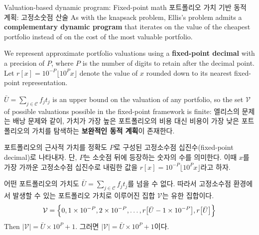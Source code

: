 \documentclass[11pt,mathserif,notheorems]{beamer}
\theoremstyle{definition}
\theoremstyle{definition}
\begin{document}
\begin{frame}{\ifen Valuation-based dynamic program: Fixed-point math \else 포트폴리오 가치 기반 동적 계획: 고정소숫점 산술 \fi}
\ifen 
As with the knapsack problem, Ellis's problem admits a \textbf{complementary dynamic program} that iterates on the value of the cheapest portfolio instead of on the cost of the most valuable portfolio.

We represent approximate portfolio valuations using a \textbf{fixed-point decimal} with a precision of $P$, where $P$ is the number of digits to retain after the decimal point. Let $r[x] =  10^{-P}\lfloor 10^P x \rfloor$ denote the value of $x$ rounded down to its nearest fixed-point representation.

$\bar U = \sum_{j\in \mathcal{C}} f_j t_j$ is an upper bound on the valuation of any portfolio, so the set $\mathcal{V}$ of possible valuations possible in the fixed-point framework is finite:
\else
엘리스의 문제는 배낭 문제와 같이, 가치가 가장 높은 포트폴리오의 비용 대신 비용이 가장 낮은 포트폴리오의 가치를 탐색하는 \textbf{보완적인 동적 계획}이 존재한다. 

포트폴리오의 근사적 가치를 정확도 $P$로 구성된 고정소수점 십진수(fixed-point decimal)로 나타내자. 단, $P$는 소숫점 뒤에 등장하는 숫자의 수를 의미한다. 이때 $x$를 가장 가까운 고정소수점 십진수로 내림한 값을 $r[x] =  10^{-P}\lfloor 10^P x \rfloor$라고 하자.

어떤 포트폴리오의 가치도 $\bar U = \sum_{j\in \mathcal{C}} f_j t_j$를 넘을 수 없다. 따라서 고정소수점 환경에서 발생할 수 있는 포트폴리오 가치로 이루어진 집합 $\mathcal{V}$는 유한 집합이다.
\fi
\begin{equation*}
\mathcal{V} = \Bigl\{0, 1\times 10^{-P}, 2\times 10^{-P}, \dots, r\bigl[\bar U- 1\times 10^{-P}\bigr], r\bigl[\bar U\bigr]\Bigr\}
\end{equation*}
\ifen Then $|\mathcal{V} | = \bar U \times 10^P + 1$.
\else 그러면 $|\mathcal{V} | = \bar U \times 10^P + 1$이다.\fi
\end{frame}
\end{document}
